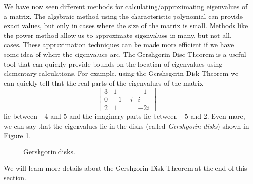 \label{sec:complex_eigenvalues}

\vspace*{-17 pt}

\vspace*{13 pt}


We have now seen different methods for calculating/approximating eigenvalues of a matrix. The algebraic method using the characteristic polynomial can provide exact values, but only in cases where the size of the matrix is small. Methods like the power method allow us to approximate eigenvalues in many, but not all, cases. These approximation techniques can be made more efficient if we have some idea of where the eigenvalues are. The Gershgorin Disc Theorem is a useful tool that can quickly provide bounds on the location of eigenvalues using elementary calculations. For example, using the Gershsgorin Disk Theorem we can quickly tell that the real parts of the eigenvalues of the matrix 
\[\left[ \begin{array}{ccr} 3&1&-1 \\ 0&-1+i&i \\ 2&1&-2i \end{array} \right]\]
lie between $-4$ and 5 and the imaginary parts lie between $-5$ and 2. Even more, we can say that the eigenvalues lie in the disks (called \emph{Gershgorin disks}) shown in Figure \ref{F:Gershgorin_1}.
\begin{figure}[ht]
\begin{center}
\end{center}
\caption{Gershgorin disks.}
\label{F:Gershgorin_1}
\end{figure}
We will learn more details about the Gershgorin Disk Theorem at the end of this section. 

